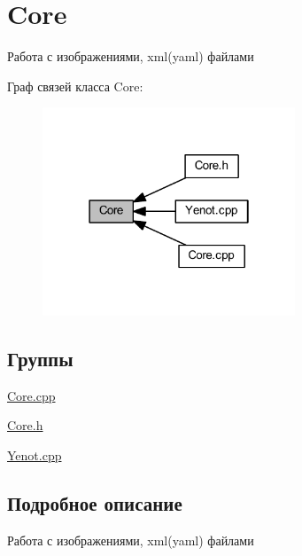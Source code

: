 \hypertarget{group__core}{}\section{Core}
\label{group__core}


Работа с изображениями, xml(yaml) файлами  


Граф связей класса Core\+:\nopagebreak
\begin{figure}[H]
\begin{center}
\leavevmode
\includegraphics[width=214pt]{group__core}
\end{center}
\end{figure}
\subsection*{Группы}
\begin{DoxyCompactItemize}
\item 
\mbox{\hyperlink{group__corecpp}{Core.\+cpp}}
\item 
\mbox{\hyperlink{group__coreh}{Core.\+h}}
\item 
\mbox{\hyperlink{group__yenotcpp}{Yenot.\+cpp}}
\end{DoxyCompactItemize}


\subsection{Подробное описание}
Работа с изображениями, xml(yaml) файлами 

